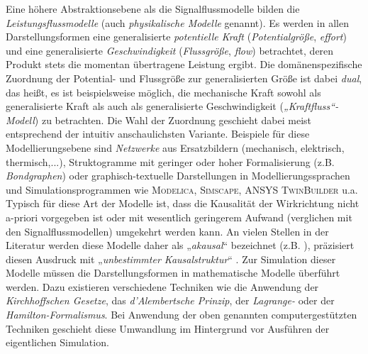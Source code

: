 Eine höhere Abstraktionsebene als die Signalflussmodelle bilden die \emph{Leistungsflussmodelle} (auch \emph{physikalische Modelle} genannt). Es werden in allen Darstellungsformen eine generalisierte \emph{potentielle Kraft} (\emph{Potentialgröße}, \emph{effort}) und eine generalisierte \emph{Geschwindigkeit} (\emph{Flussgröße}, \emph{flow}) betrachtet, deren Produkt stets die momentan übertragene Leistung ergibt. Die domänenspezifische Zuordnung der Potential- und Flussgröße zur generalisierten Größe ist dabei \emph{dual}, das heißt, es ist beispielsweise möglich, die mechanische Kraft sowohl als generalisierte Kraft als auch als generalisierte Geschwindigkeit (\emph{„Kraftfluss“-Modell}) zu betrachten. Die Wahl der Zuordnung geschieht dabei meist entsprechend der intuitiv anschaulichsten Variante. Beispiele für diese Modellierungsebene sind \emph{Netzwerke} aus Ersatzbildern (mechanisch, elektrisch, thermisch,...), Struktogramme mit geringer oder hoher Formalisierung (z.B. \emph{Bondgraphen}) oder graphisch-textuelle Darstellungen in Modellierungssprachen und Simulationsprogrammen wie \textsc{Modelica}, \textsc{Simscape}, \textsc{ANSYS TwinBuilder} u.a. Typisch für diese Art der Modelle ist, dass die Kausalität der Wirkrichtung nicht a-priori vorgegeben ist oder mit wesentlich geringerem Aufwand (verglichen mit den Signalflussmodellen) umgekehrt werden kann. An vielen Stellen in der Literatur werden diese Modelle daher als „\emph{akausal}“ bezeichnet (z.B.  \cites{gesenhuesObjektorientiertmodellbasierteCharakterisierungUberwachung2019,schmittMethodenZurModellbildung2019,richterEinsatzVirtuellerPrototypen2013}), \citeauthor{janschekSystementwurfMechatronischerSysteme2010} präzisiert diesen Ausdruck mit „\emph{unbestimmter Kausalstruktur}“ \cite[S.~118]{janschekSystementwurfMechatronischerSysteme2010}. Zur Simulation dieser Modelle müssen die Darstellungsformen in mathematische Modelle überführt werden. Dazu existieren verschiedene Techniken wie die Anwendung der \emph{Kirchhoffschen Gesetze}, das \emph{d’Alembertsche Prinzip}, der \emph{Lagrange-} oder der \emph{Hamilton-Formalismus}. Bei Anwendung der oben genannten computergestützten Techniken geschieht diese Umwandlung im Hintergrund vor Ausführen der eigentlichen Simulation. 

